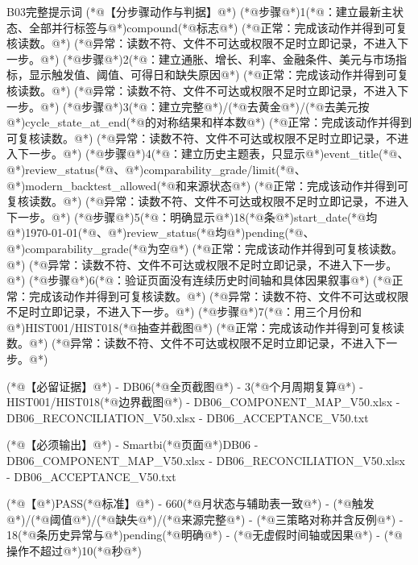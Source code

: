 \documentclass[UTF8,openany,zihao=-4]{ctexbook}
\renewcommand{\_}{\textunderscore\allowbreak}
\begin{document}
\begin{PromptBox}{B03完整提示词}
(*@{\promptcjk 【分步骤动作与判据】}@*)
(*@{\promptcjk 步骤}@*)1(*@{\promptcjk ：建立最新主状态、全部并行标签与}@*)compound(*@{\promptcjk 标志}@*)
  (*@{\promptcjk 正常：完成该动作并得到可复核读数。}@*)
  (*@{\promptcjk 异常：读数不符、文件不可达或权限不足时立即记录，不进入下一步。}@*)
(*@{\promptcjk 步骤}@*)2(*@{\promptcjk ：建立通胀、增长、利率、金融条件、美元与市场指标，显示触发值、阈值、可得日和缺失原因}@*)
  (*@{\promptcjk 正常：完成该动作并得到可复核读数。}@*)
  (*@{\promptcjk 异常：读数不符、文件不可达或权限不足时立即记录，不进入下一步。}@*)
(*@{\promptcjk 步骤}@*)3(*@{\promptcjk ：建立完整}@*)/(*@{\promptcjk 去黄金}@*)/(*@{\promptcjk 去美元按}@*)cycle_state_at_end(*@{\promptcjk 的对称结果和样本数}@*)
  (*@{\promptcjk 正常：完成该动作并得到可复核读数。}@*)
  (*@{\promptcjk 异常：读数不符、文件不可达或权限不足时立即记录，不进入下一步。}@*)
(*@{\promptcjk 步骤}@*)4(*@{\promptcjk ：建立历史主题表，只显示}@*)event_title(*@{\promptcjk 、}@*)review_status(*@{\promptcjk 、}@*)comparability_grade/limit(*@{\promptcjk 、}@*)modern_backtest_allowed(*@{\promptcjk 和来源状态}@*)
  (*@{\promptcjk 正常：完成该动作并得到可复核读数。}@*)
  (*@{\promptcjk 异常：读数不符、文件不可达或权限不足时立即记录，不进入下一步。}@*)
(*@{\promptcjk 步骤}@*)5(*@{\promptcjk ：明确显示}@*)18(*@{\promptcjk 条}@*)start_date(*@{\promptcjk 均}@*)1970-01-01(*@{\promptcjk 、}@*)review_status(*@{\promptcjk 均}@*)pending(*@{\promptcjk 、}@*)comparability_grade(*@{\promptcjk 为空}@*)
  (*@{\promptcjk 正常：完成该动作并得到可复核读数。}@*)
  (*@{\promptcjk 异常：读数不符、文件不可达或权限不足时立即记录，不进入下一步。}@*)
(*@{\promptcjk 步骤}@*)6(*@{\promptcjk ：验证页面没有连续历史时间轴和具体因果叙事}@*)
  (*@{\promptcjk 正常：完成该动作并得到可复核读数。}@*)
  (*@{\promptcjk 异常：读数不符、文件不可达或权限不足时立即记录，不进入下一步。}@*)
(*@{\promptcjk 步骤}@*)7(*@{\promptcjk ：用三个月份和}@*)HIST001/HIST018(*@{\promptcjk 抽查并截图}@*)
  (*@{\promptcjk 正常：完成该动作并得到可复核读数。}@*)
  (*@{\promptcjk 异常：读数不符、文件不可达或权限不足时立即记录，不进入下一步。}@*)

(*@{\promptcjk 【必留证据】}@*)
- DB06(*@{\promptcjk 全页截图}@*)
- 3(*@{\promptcjk 个月周期复算}@*)
- HIST001/HIST018(*@{\promptcjk 边界截图}@*)
- DB06_COMPONENT_MAP_V50.xlsx
- DB06_RECONCILIATION_V50.xlsx
- DB06_ACCEPTANCE_V50.txt

(*@{\promptcjk 【必须输出】}@*)
- Smartbi(*@{\promptcjk 页面}@*)DB06
- DB06_COMPONENT_MAP_V50.xlsx
- DB06_RECONCILIATION_V50.xlsx
- DB06_ACCEPTANCE_V50.txt

(*@{\promptcjk 【}@*)PASS(*@{\promptcjk 标准】}@*)
- 660(*@{\promptcjk 月状态与辅助表一致}@*)
- (*@{\promptcjk 触发}@*)/(*@{\promptcjk 阈值}@*)/(*@{\promptcjk 缺失}@*)/(*@{\promptcjk 来源完整}@*)
- (*@{\promptcjk 三策略对称并含反例}@*)
- 18(*@{\promptcjk 条历史异常与}@*)pending(*@{\promptcjk 明确}@*)
- (*@{\promptcjk 无虚假时间轴或因果}@*)
- (*@{\promptcjk 操作不超过}@*)10(*@{\promptcjk 秒}@*)


\end{PromptBox}
\end{document}

